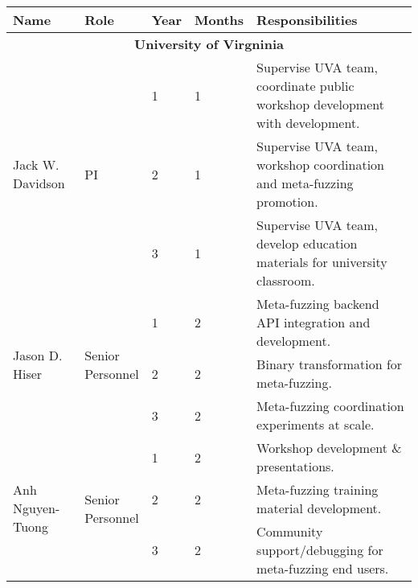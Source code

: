 \documentclass[11pt]{article}
\begin{document}
\begin{tabularx}{\textwidth}{llllX}
Name & Role & Year &  Months & Responsibilities \\\midrule
\multicolumn{5}{c}{\textbf{University of Virgninia}} \\\midrule
\multirow{3}{*}{Jack W. Davidson}& \multirow{3}{*}{PI} & 1  & 1 & Supervise UVA team, coordinate public workshop development with development. \\
                                 &                     & 2  & 1 &  Supervise UVA team, workshop coordination and meta-fuzzing promotion.\\
                                 &                     & 3  & 1 &  Supervise UVA team, develop education materials for university classroom. \\
\multirow{3}{*}{Jason D. Hiser}  & \multirow{3}{*}{\parbox{1.75cm}{Senior \\ Personnel}} & 1 & 2   &  Meta-fuzzing backend API integration and development. \\
                                 &                     & 2  & 2 & Binary transformation for meta-fuzzing. \\
                                 &                     & 3  & 2 & Meta-fuzzing coordination experiments at scale. \\\midrule
\multirow{3}{*}{Anh Nguyen-Tuong}& \multirow{3}{*}{\parbox{1.75cm}{Senior \\ Personnel}} & 1 & 2  &  Workshop development \& presentations. \\
                                 &                     & 2  & 2 & Meta-fuzzing training material development. \\
                                 &                     & 3  & 2 &  Community support/debugging for meta-fuzzing end users. \\\bottomrule
\end{tabularx}
\end{document}
